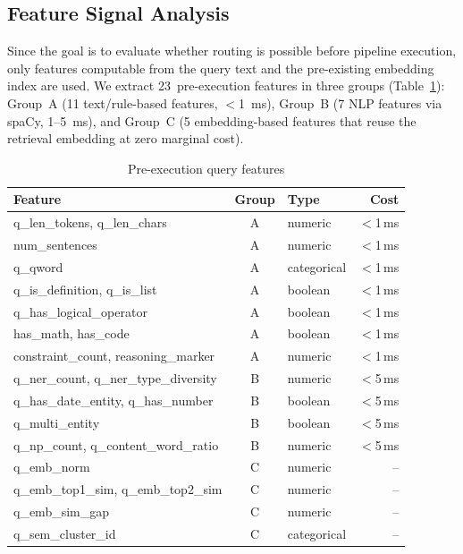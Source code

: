 \subsection{Feature Signal Analysis}
\label{subsec:features-signal}

Since the goal is to evaluate whether routing is possible before pipeline execution, only features computable
from the query text and the pre-existing embedding index are used. We
extract 23~pre-execution features in three groups (Table~\ref{tab:query-features}):
Group~A (11 text/rule-based features, $<$1~ms), Group~B (7 NLP features via
spaCy, 1--5~ms), and Group~C (5 embedding-based features that reuse the
retrieval embedding at zero marginal cost).

\begin{table}[h!]
\centering
\small
\begin{tabular}{l c l r}
\hline
\textbf{Feature} & \textbf{Group} & \textbf{Type} & \textbf{Cost} \\
\hline
q\_len\_tokens, q\_len\_chars       & A & numeric   & $<$1\,ms \\
num\_sentences                      & A & numeric   & $<$1\,ms \\
q\_qword                            & A & categorical & $<$1\,ms \\
q\_is\_definition, q\_is\_list      & A & boolean   & $<$1\,ms \\
q\_has\_logical\_operator            & A & boolean   & $<$1\,ms \\
has\_math, has\_code                 & A & boolean   & $<$1\,ms \\
constraint\_count, reasoning\_marker & A & numeric   & $<$1\,ms \\
\hline
q\_ner\_count, q\_ner\_type\_diversity & B & numeric & $<$5\,ms \\
q\_has\_date\_entity, q\_has\_number   & B & boolean & $<$5\,ms \\
q\_multi\_entity                       & B & boolean & $<$5\,ms \\
q\_np\_count, q\_content\_word\_ratio  & B & numeric & $<$5\,ms \\
\hline
q\_emb\_norm                              & C & numeric     & -- \\
q\_emb\_top1\_sim, q\_emb\_top2\_sim      & C & numeric     & -- \\
q\_emb\_sim\_gap                          & C & numeric     & -- \\
q\_sem\_cluster\_id                       & C & categorical & -- \\
\hline
\end{tabular}
\caption{Pre-execution query features}
\label{tab:query-features}
\end{table}

